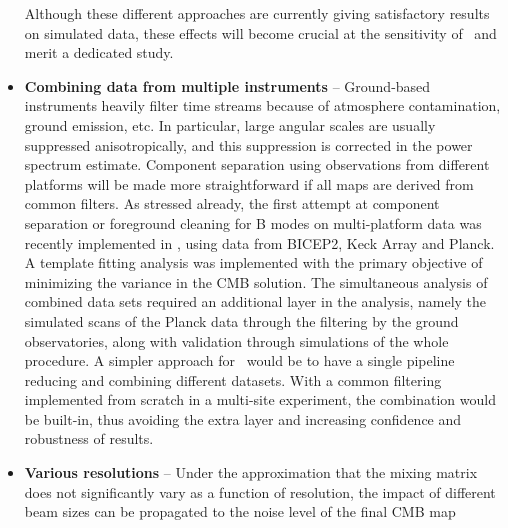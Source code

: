 \begin{itemize}
Although these different approaches are currently giving satisfactory results on simulated data, these effects will become crucial at the sensitivity of \cmbexp\ and merit a dedicated study. 
	\item \textbf{Combining data from multiple instruments} -- Ground-based instruments heavily filter time streams because of atmosphere contamination, ground emission, etc. %
	In particular, large angular scales are usually suppressed anisotropically, and this suppression is corrected in the power spectrum estimate. 
Component separation using observations from different platforms will be made more straightforward if all maps are derived from common filters. 
As stressed already, the first attempt at component separation or foreground cleaning for  B modes on multi-platform data was recently implemented in \cite{Ade:2015tva}, using data from BICEP2, Keck Array and Planck. A template fitting analysis was implemented with the primary objective of minimizing the variance in the CMB solution.%
The simultaneous analysis of combined data sets 
required an additional layer in the analysis, namely the simulated scans of the Planck data through the filtering by the ground observatories, along with validation through simulations of the whole procedure. A simpler approach for \cmbexp\ would be to have a single pipeline reducing and combining different datasets. With a common filtering implemented from scratch in a multi-site experiment, the %
combination would be built-in, thus avoiding the extra layer and increasing confidence and robustness of results.
	\item \textbf{Various resolutions} -- Under the approximation that the mixing matrix does not significantly vary as a function of resolution, the impact of different beam sizes can be propagated to the noise level of the final CMB map %

\end{itemize}
